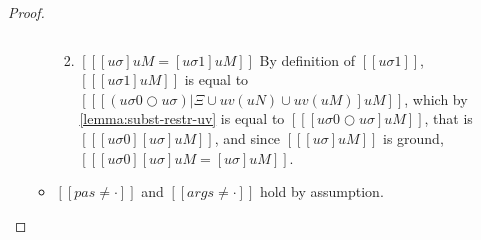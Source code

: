 \begin{proof}
\begin{caseof}
\begin{enumerate}
\begin{itemize}
\begin{enumerate}
$$                                    $$
                                \item $[[ [uσ]uM = [uσ1]uM]]$
                                        By definition of $[[uσ1]]$,
                                        $[[ [uσ1]uM ]]$ is equal to 
                                        $[[ [(uσ0 ○ uσ)|Ξ ∪ uv(uN) ∪ uv(uM)]uM ]]$,
                                        which by \cref{lemma:subst-restr-uv} is equal to
                                        $[[ [uσ0 ○ uσ]uM ]]$,
                                        that is $[[ [uσ0][uσ]uM ]]$,
                                        and since $[[ [uσ]uM ]]$ is ground, 
                                        $[[ [uσ0][uσ]uM = [uσ]uM ]]$.
                            \end{enumerate}
                        \item $[[pas ≠ ·]]$ and $[[args ≠ ·]]$ hold by assumption.
                    \end{itemize}
            \end{enumerate}
    \end{caseof}
\end{proof}


